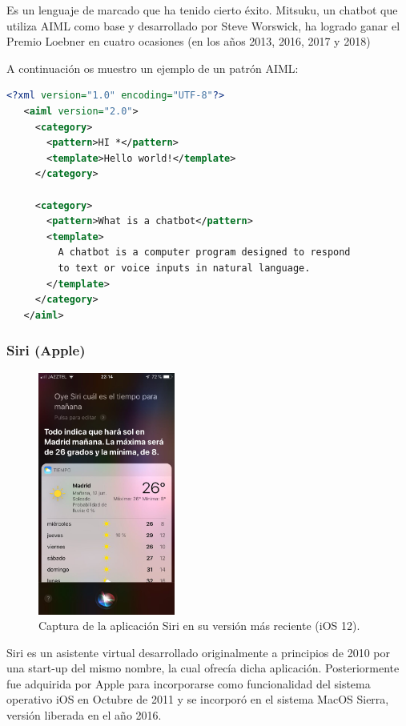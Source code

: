 \documentclass[spanish,12pt, a4paper, twoside]{paper}
\begin{document}
Es un lenguaje de marcado que ha tenido cierto éxito. Mitsuku, un chatbot que utiliza AIML como base y desarrollado por Steve Worswick, ha logrado ganar el Premio Loebner en cuatro ocasiones (en los años 2013, 2016, 2017 y 2018)

A continuación os muestro un ejemplo de un patrón AIML:
\begin{lstlisting}[language=xml]
<?xml version="1.0" encoding="UTF-8"?>
   <aiml version="2.0">
     <category>
       <pattern>HI *</pattern>
       <template>Hello world!</template>
     </category>

     <category>
       <pattern>What is a chatbot</pattern>
       <template>
         A chatbot is a computer program designed to respond
         to text or voice inputs in natural language.
       </template>
     </category>
   </aiml>
\end{lstlisting}

\subsubsection{Siri (Apple)}

\begin{figure}[h]
\centering
	\includegraphics[width=0.4\textwidth]{recursos/siri}
\caption{Captura de la aplicación Siri en su versión más reciente (iOS 12).}
\label{fig:Siri}
\end{figure}

Siri es un asistente virtual desarrollado originalmente a principios de 2010 por una start-up del mismo nombre, la cual ofrecía dicha aplicación. Posteriormente fue adquirida por Apple para incorporarse como funcionalidad del sistema operativo iOS en Octubre de 2011 y se incorporó en el sistema MacOS Sierra, versión liberada en el año 2016.
\newline
\end{document}
